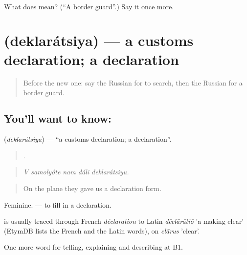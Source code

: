 \begin{tcolorbox}[breakable,colback=teal!4,colframe=teal!35!black,title={Before you move on}]
What does  mean? (\textquotedblleft{}A border guard\textquotedblright{}.) Say it once more.
\end{tcolorbox}
\section[\texorpdfstring{\ru{декларация} (deklarátsiya)}{декларация (deklarátsiya)}]{ (deklarátsiya) — a customs declaration; a declaration}

\label{lesson:RU-C420-deklaratsiya}



\begin{quote}
Before the new one: say the Russian for to search, then the Russian for a border guard.
\end{quote}

\subsection*{You'll want to know: }
\textbf{} (\emph{deklarátsiya}) — \textquotedblleft{}a customs declaration; a declaration\textquotedblright{}.

\begin{quote}
    .
\end{quote}

\begin{quote}
\emph{V samolyóte nam dáli deklarátsiyu.}
\end{quote}

\begin{quote}
On the plane they gave us a declaration form.
\end{quote}

Feminine. \emph{ } — to fill in a declaration.

\begin{cousinweb}
\emph{} is usually traced through French \emph{déclaration} to Latin \emph{dēclārātiō} 'a making clear' (EtymDB lists the French and the Latin words), on \emph{clārus} 'clear'.
\end{cousinweb}

\begin{grammarlens}[title={What you've built}]
One more word for telling, explaining and describing at B1.
\end{grammarlens}

